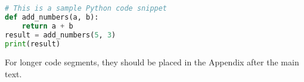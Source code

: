 \documentclass[12pt]{article}
\begin{document}
\newpage


\begin{center}
\begin{lstlisting}[language=Python]
# This is a sample Python code snippet
def add_numbers(a, b):
    return a + b
result = add_numbers(5, 3)
print(result)
\end{lstlisting}
\end{center}

For longer code segments, they should be placed in the Appendix after the main text.

\end{document}
